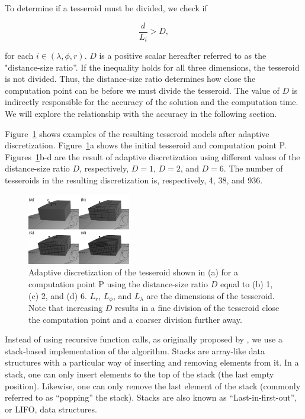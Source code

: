 \documentclass[paper,twocolumn,twoside]{geophysics}
\begin{document}
To determine if a tesseroid must be divided,
we check if

\begin{equation}
    \frac{d}{L_i} > D,
    \label{eq:condition}
\end{equation}

\noindent
for each $i \in (\lambda, \phi, r)$.
$D$ is a positive scalar
hereafter referred to as the "distance-size ratio''.
If the inequality holds for all three dimensions,
the tesseroid is not divided.
Thus, the distance-size ratio determines
how close the computation point can be
before we must divide the tesseroid.
The value of $D$ is indirectly responsible for
the accuracy of the solution and the computation time.
We will explore the relationship with the accuracy in the following section.

Figure~\ref{fig:division} shows examples of
the resulting tesseroid models after adaptive discretization.
Figure~\ref{fig:division}a shows
the initial tesseroid and computation point P.
Figures~\ref{fig:division}b-d are
the result of adaptive discretization using
different values of the distance-size ratio $D$,
respectively,
$D=1$, $D=2$, and $D=6$.
The number of tesseroids in the resulting discretization is, respectively,
4, 38, and 936.

\begin{figure}
    \centering
    \includegraphics[width=0.4\textwidth]{figs/tesseroid-split}
    \caption{
        Adaptive discretization
        of the tesseroid shown in (a)
        for a computation point P
        using the distance-size ratio $D$ equal to
        (b) 1, (c) 2, and (d) 6.
        $L_r$, $L_\phi$, and $L_\lambda$ are the dimensions of the tesseroid.
        Note that increasing $D$
        results in a fine division of the tesseroid
        close the computation point
        and a coarser division further away.
    }
    \label{fig:division}
\end{figure}

Instead of using recursive function calls,
as originally proposed by \citet{Li2011},
we use a stack-based implementation of the algorithm.
Stacks are array-like data structures
with a particular way of inserting and removing elements from it.
In a stack,
one can only insert elements to the top of the stack
(the last empty position).
Likewise,
one can only remove the last element of the stack
(commonly referred to as ``popping'' the stack).
Stacks are also known as ``Last-in-first-out'', or LIFO, data structures.
\end{document}
